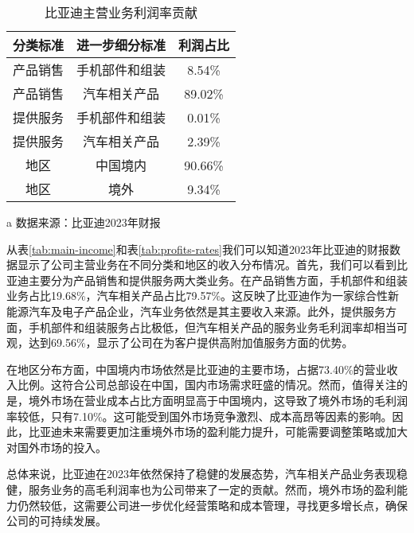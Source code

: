 \begin{table}
  \centering
  \begin{threeparttable}[c]
    \caption{比亚迪主营业务利润率贡献}
    \label{tab:profits-rates}
    \begin{tabular}{ccc}
      \toprule
        分类标准 & 进一步细分标准 & 利润占比 \\ 
      \midrule
        产品销售 & 手机部件和组装 & 8.54\% \\ 
        产品销售 & 汽车相关产品 & 89.02\% \\ 
        提供服务 & 手机部件和组装 & 0.01\% \\ 
        提供服务 & 汽车相关产品 & 2.39\% \\ 
        地区 & 中国境内 & 90.66\% \\ 
        地区 & 境外 & 9.34\% \\ 
      \bottomrule
    \end{tabular}
    \begin{tablenotes}
      \item [a] 数据来源：比亚迪2023年财报
    \end{tablenotes}
  \end{threeparttable}
\end{table}
从表\eqref{tab:main-income}和表\eqref{tab:profits-rates}我们可以知道2023年比亚迪的财报数据显示了公司主营业务在不同分类和地区的收入分布情况。首先，我们可以看到比亚迪主要分为产品销售和提供服务两大类业务。在产品销售方面，手机部件和组装业务占比19.68\%，汽车相关产品占比79.57\%。这反映了比亚迪作为一家综合性新能源汽车及电子产品企业，汽车业务依然是其主要收入来源。此外，提供服务方面，手机部件和组装服务占比极低，但汽车相关产品的服务业务毛利润率却相当可观，达到69.56\%，显示了公司在为客户提供高附加值服务方面的优势。

在地区分布方面，中国境内市场依然是比亚迪的主要市场，占据73.40\%的营业收入比例。这符合公司总部设在中国，国内市场需求旺盛的情况。然而，值得关注的是，境外市场在营业成本占比方面明显高于中国境内，这导致了境外市场的毛利润率较低，只有7.10\%。这可能受到国外市场竞争激烈、成本高昂等因素的影响。因此，比亚迪未来需要更加注重境外市场的盈利能力提升，可能需要调整策略或加大对国外市场的投入。

总体来说，比亚迪在2023年依然保持了稳健的发展态势，汽车相关产品业务表现稳健，服务业务的高毛利润率也为公司带来了一定的贡献。然而，境外市场的盈利能力仍然较低，这需要公司进一步优化经营策略和成本管理，寻找更多增长点，确保公司的可持续发展。